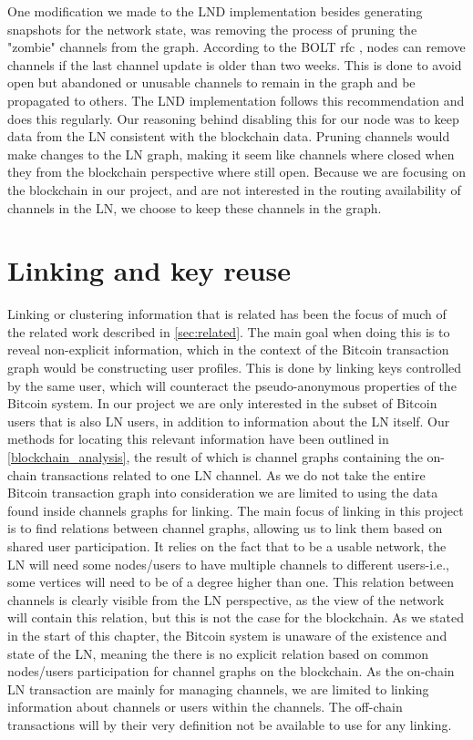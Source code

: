 
One modification we made to the LND implementation besides generating snapshots for the network state, was removing the process of pruning the "zombie" channels from the graph. According to the BOLT rfc \cite{bolt7}, nodes can remove channels if the last channel update is older than two weeks. This is done to avoid open but abandoned or unusable channels to remain in the graph and be propagated to others. The LND implementation follows this recommendation and does this regularly. Our reasoning behind disabling this for our node was to keep data from the LN consistent with the blockchain data. Pruning channels would make changes to the LN graph, making it seem like channels where closed when they from the blockchain perspective where still open. Because we are focusing on the blockchain in our project, and are not interested in the routing availability of channels in the LN, we choose to keep these channels in the graph.

\section{Linking and key reuse}
\label{sec:linking}

Linking or clustering information that is related has been the focus of much of the related work described in \cref{sec:related}. The main goal when doing this is to reveal non-explicit information, which in the context of the Bitcoin transaction graph would be constructing user profiles. 
This is done by linking keys controlled by the same user, which will counteract the pseudo-anonymous properties of the Bitcoin system. In our project we are only interested in the subset of Bitcoin users that is also LN users, in addition to information about the LN itself. 
Our methods for locating this relevant information have been outlined in \cref{blockchain_analysis}, the result of which is channel graphs containing the on-chain transactions related to one LN channel. 
As we do not take the entire Bitcoin transaction graph into consideration we are limited to using the data found inside channels graphs for linking. The main focus of linking in this project is to find relations between channel graphs, allowing us to link them based on shared user participation.
It relies on the fact that to be a usable network, the LN will need some nodes/users to have multiple channels to different users-i.e., some vertices will need to be of a degree higher than one. This relation between channels is clearly visible from the LN perspective, as the view of the network will contain this relation, but this is not the case for the blockchain. As we stated in the start of this chapter, the Bitcoin system is unaware of the existence and state of the LN, meaning the there is no explicit relation based on common nodes/users participation for channel graphs on the blockchain. As the on-chain LN transaction are mainly for managing channels, we are limited to linking information about channels or users within the channels. The off-chain transactions will by their very definition not be available to use for any linking.
\\

